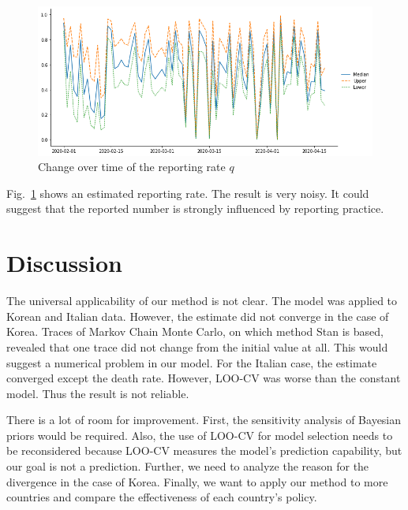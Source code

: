 \documentclass{article}
\begin{document}
\begin{figure}[h]
 \centering
 \includegraphics[width=\linewidth]{fig/q-Japan.png}
 \caption{Change over time of the reporting rate $q$}
 \label{fig:q}
\end{figure}

Fig.~\ref{fig:q} shows an estimated reporting rate.
The result is very noisy.
It could suggest that the reported number is strongly influenced by reporting practice.

\section{Discussion}

The universal applicability of our method is not clear.
The model was applied to Korean and Italian data.
However, the estimate did not converge in the case of Korea.
Traces of Markov Chain Monte Carlo, on which method Stan is based, revealed that one trace did not change from the initial value at all.
This would suggest a numerical problem in our model.
For the Italian case, the estimate converged except the death rate.
However, LOO-CV was worse than the constant model. Thus the result is not reliable.

There is a lot of room for improvement.
First, the sensitivity analysis of Bayesian priors would be required.
Also, the use of LOO-CV for model selection needs to be reconsidered because LOO-CV measures the model's prediction capability, but our goal is not a prediction.
Further, we need to analyze the reason for the divergence in the case of Korea.
Finally, we want to apply our method to more countries and compare the effectiveness of each country's policy. 



\end{document}
